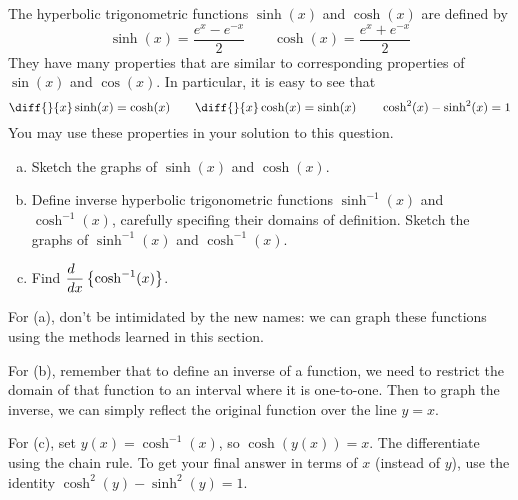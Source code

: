\begin{question}[2012H]
The hyperbolic trigonometric functions $\sinh(x)$ and
$\cosh(x)$ are defined by
$$
\sinh(x)=\dfrac{e^x-e^{-x}}{2}\qquad
\cosh(x)=\dfrac{e^x+e^{-x}}{2}
$$
They have many properties that are similar to corresponding properties
of $\sin(x)$ and $\cos(x)$. In particular, it is easy to see that
$$
\diff{}{x} \sinh(x)=\cosh(x)\qquad
\diff{}{x} \cosh(x)=\sinh(x)\qquad
\cosh^2(x)-\sinh^2(x)=1
$$
You may use these properties in your solution to this question.
\begin{enumerate}[(a)]
\item Sketch the graphs of $\sinh(x)$ and $\cosh(x)$.
\item Define inverse hyperbolic trigonometric functions
$\sinh^{-1}(x)$ and $\cosh^{-1}(x)$, carefully specifing their domains
of definition. Sketch the graphs of $\sinh^{-1}(x)$ and $\cosh^{-1}(x)$.
\item Find
$
\dfrac{d\hfill}{dx}\left\{ \cosh^{-1}(x)\right\}
$.
\end{enumerate}
\end{question}
\begin{hint}
For (a), don't be intimidated by the new names: we can graph these functions using the methods learned in this section.

For (b), remember that to define an inverse of a function, we need to restrict the domain of that function to an interval where it is one-to-one. Then to graph the inverse, we can simply reflect the original function over the line $y=x$.

For (c), set $y(x)=\cosh^{-1}(x)$, so $\cosh(y(x))=x$. The differentiate using the chain rule. To get your final answer in terms of $x$ (instead of $y$), use the identity $\cosh^2(y)-\sinh^2(y)=1$.
\end{hint}
